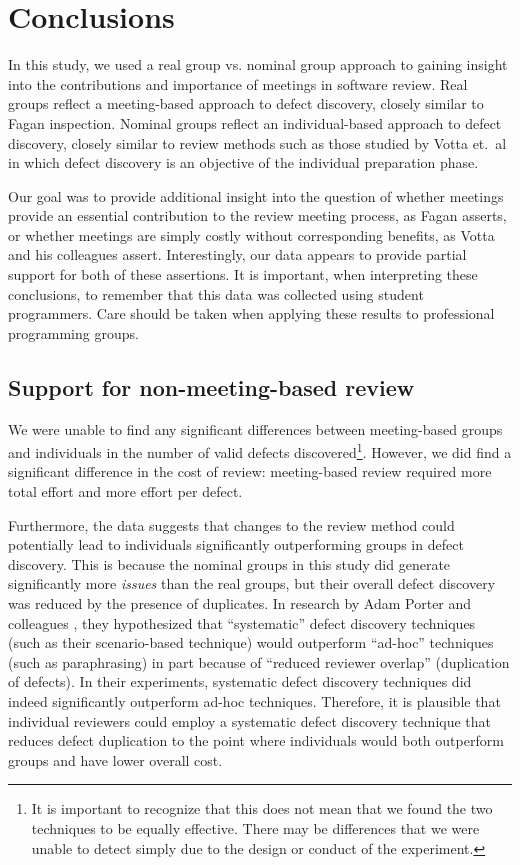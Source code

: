 \section{Conclusions}

In this study, we used a real group vs. nominal group approach to gaining
insight into the contributions and importance of meetings in software
review. Real groups reflect a meeting-based approach to defect discovery,
closely similar to Fagan inspection. Nominal groups reflect an
individual-based approach to defect discovery, closely similar to review
methods such as those studied by Votta et.~al in which defect discovery is
an objective of the individual preparation phase.

Our goal was to provide additional insight into the question of whether
meetings provide an essential contribution to the review meeting process,
as Fagan asserts, or whether meetings are simply costly without
corresponding benefits, as Votta and his colleagues assert.  Interestingly,
our data appears to provide partial support for both of these assertions.
It is important, when interpreting these conclusions, to remember
that this data was collected using student programmers. Care should
be taken when applying these results to professional programming 
groups.

\subsection{Support for non-meeting-based review}

We were unable to find any significant differences between meeting-based
groups and individuals in the number of valid defects discovered\footnote{It
  is important to recognize that this does not mean that we found the two
  techniques to be equally effective. There may be differences
  that we were unable to detect simply due to the design or conduct of the
  experiment.}. However, we did find a significant difference in the cost of
review: meeting-based review required more total effort and more effort per
defect.

Furthermore, the data suggests that changes to the review method could
potentially lead to individuals significantly outperforming groups in
defect discovery.  This is because the nominal groups in this study did
generate significantly more {\em issues} than the real groups, but their overall
defect discovery was reduced by the presence of duplicates.  In research by
Adam Porter and colleagues \cite{Porter95}, they hypothesized that
``systematic'' defect discovery techniques (such as their scenario-based
technique) would outperform ``ad-hoc'' techniques (such as paraphrasing) in
part because of ``reduced reviewer overlap'' (duplication of defects). In
their experiments, systematic defect discovery techniques did indeed
significantly outperform ad-hoc techniques.  Therefore, it is plausible
that individual reviewers could employ a systematic defect discovery
technique that reduces defect duplication to the point where individuals
would both outperform groups and have lower overall cost. 


